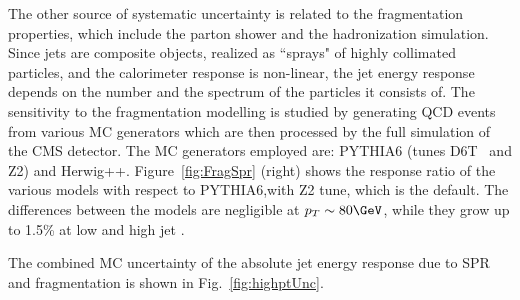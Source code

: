 The other source of systematic uncertainty is related to the fragmentation properties, which include the parton shower and the hadronization simulation. Since jets are composite objects, realized as ``sprays" of highly collimated particles, and the calorimeter response is non-linear, the jet energy response depends on the number and the spectrum of the particles it consists of. The sensitivity to the fragmentation modelling is studied by generating QCD events from various MC generators which are then processed by the full simulation of the CMS detector. The MC generators employed are: {\sc PYTHIA6} (tunes D6T~\cite{D6T} and Z2) and {\sc Herwig++}\cite{HERWIG}. Figure~\ref{fig:FragSpr} (right) shows the response ratio of the various models with respect to {\sc PYTHIA6},with Z2 tune, which is the default. The differences between the models are negligible at $\pt\sim 80\GeV$, while they grow up to 1.5\% at low and high jet \pt. 

The combined MC uncertainty of the absolute jet energy response due to SPR and fragmentation is shown in Fig.~\ref{fig:highptUnc}.

